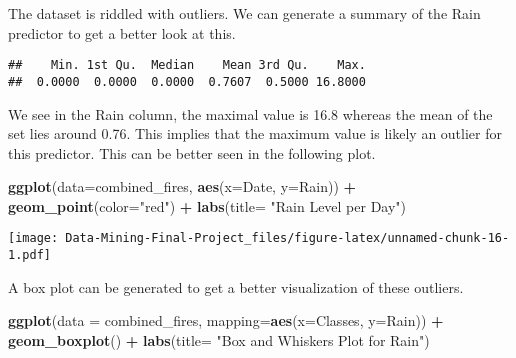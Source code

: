 \documentclass[
]{article}
\newenvironment{Shaded}{\begin{snugshade}}{\end{snugshade}}
\newcommand{\AttributeTok}[1]{\textcolor[rgb]{0.13,0.29,0.53}{#1}}
\newcommand{\FunctionTok}[1]{\textcolor[rgb]{0.13,0.29,0.53}{\textbf{#1}}}
\newcommand{\NormalTok}[1]{#1}
\newcommand{\SpecialCharTok}[1]{\textcolor[rgb]{0.81,0.36,0.00}{\textbf{#1}}}
\newcommand{\StringTok}[1]{\textcolor[rgb]{0.31,0.60,0.02}{#1}}
\begin{document}
The dataset is riddled with outliers. We can generate a summary of the
Rain predictor to get a better look at this.

\begin{Shaded}
\end{Shaded}

\begin{verbatim}
##    Min. 1st Qu.  Median    Mean 3rd Qu.    Max. 
##  0.0000  0.0000  0.0000  0.7607  0.5000 16.8000
\end{verbatim}

We see in the Rain column, the maximal value is 16.8 whereas the mean of
the set lies around 0.76. This implies that the maximum value is likely
an outlier for this predictor. This can be better seen in the following
plot.

\begin{Shaded}
\begin{Highlighting}[]
\FunctionTok{ggplot}\NormalTok{(}\AttributeTok{data=}\NormalTok{combined\_fires, }\FunctionTok{aes}\NormalTok{(}\AttributeTok{x=}\NormalTok{Date, }\AttributeTok{y=}\NormalTok{Rain)) }\SpecialCharTok{+} 
  \FunctionTok{geom\_point}\NormalTok{(}\AttributeTok{color=}\StringTok{"red"}\NormalTok{) }\SpecialCharTok{+}
  \FunctionTok{labs}\NormalTok{(}\AttributeTok{title=} \StringTok{"Rain Level per Day"}\NormalTok{)}
\end{Highlighting}
\end{Shaded}

\texttt{[image: Data-Mining-Final-Project\_files/figure-latex/unnamed-chunk-16-1.pdf]}

A box plot can be generated to get a better visualization of these
outliers.

\begin{Shaded}
\begin{Highlighting}[]
\FunctionTok{ggplot}\NormalTok{(}\AttributeTok{data =}\NormalTok{ combined\_fires, }\AttributeTok{mapping=}\FunctionTok{aes}\NormalTok{(}\AttributeTok{x=}\NormalTok{Classes, }\AttributeTok{y=}\NormalTok{Rain)) }\SpecialCharTok{+}
  \FunctionTok{geom\_boxplot}\NormalTok{() }\SpecialCharTok{+}
  \FunctionTok{labs}\NormalTok{(}\AttributeTok{title=} \StringTok{"Box and Whiskers Plot for Rain"}\NormalTok{)}
\end{Highlighting}
\end{Shaded}
\end{document}
